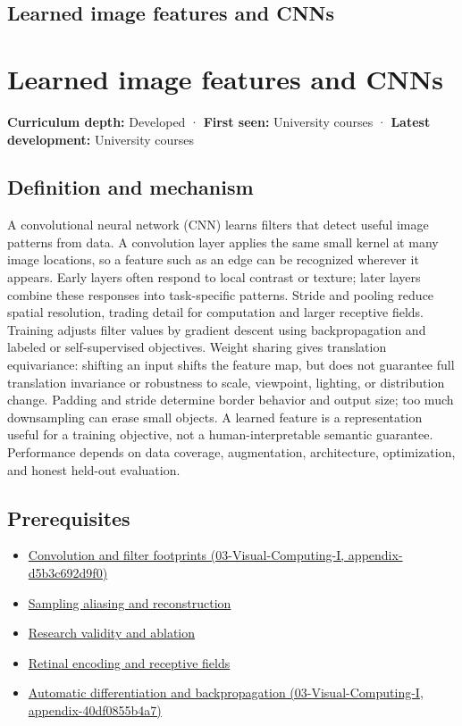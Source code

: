 \hypertarget{appendix-47c51ea026fb}{}
\section*{Learned image features and CNNs}
\chapter{Learned image features and CNNs}\label{appendix-47c51ea026fb-learned-image-features-and-cnns}

\textbf{Curriculum depth:} Developed · \textbf{First seen:} University courses · \textbf{Latest development:} University courses

\section{Definition and mechanism}\label{appendix-47c51ea026fb-definition-and-mechanism}

A convolutional neural network (CNN) learns filters that detect useful image patterns from data. A convolution layer applies the same small kernel at many image locations, so a feature such as an edge can be recognized wherever it appears. Early layers often respond to local contrast or texture; later layers combine these responses into task-specific patterns. Stride and pooling reduce spatial resolution, trading detail for computation and larger receptive fields. Training adjusts filter values by gradient descent using backpropagation and labeled or self-supervised objectives. Weight sharing gives translation equivariance: shifting an input shifts the feature map, but does not guarantee full translation invariance or robustness to scale, viewpoint, lighting, or distribution change. Padding and stride determine border behavior and output size; too much downsampling can erase small objects. A learned feature is a representation useful for a training objective, not a human-interpretable semantic guarantee. Performance depends on data coverage, augmentation, architecture, optimization, and honest held-out evaluation.

\section{Prerequisites}\label{appendix-47c51ea026fb-prerequisites}

\begin{itemize}
\tightlist
\item
  \href{../03-Visual-Computing-I/main.pdf\#nameddest=appendix-d5b3c692d9f0}{Convolution and filter footprints (03-Visual-Computing-I, appendix-d5b3c692d9f0)}
\item
  \hyperref[appendix-6a7869dd79a6]{Sampling aliasing and reconstruction}
\item
  \hyperref[appendix-65788587ef78]{Research validity and ablation}
\item
  \hyperref[appendix-7281c15ac44a]{Retinal encoding and receptive fields}
\item
  \href{../03-Visual-Computing-I/main.pdf\#nameddest=appendix-40df0855b4a7}{Automatic differentiation and backpropagation (03-Visual-Computing-I, appendix-40df0855b4a7)}
\end{itemize}


